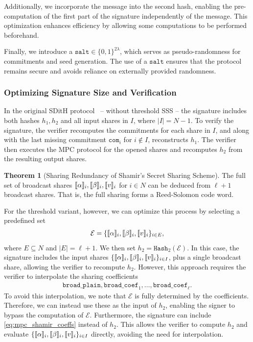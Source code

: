 \documentclass[11pt]{report}
\theoremstyle{definition}
\newtheorem{theorem}{Theorem}[section]
\theoremstyle{plain}
\begin{document}
Additionally, we incorporate the message into the second hash, enabling the pre-computation of the first part of the signature independently of the message. This optimization enhances efficiency by allowing some computations to be performed beforehand.

Finally, we introduce a $\texttt{salt} \in \{0,1\}^{2\lambda}$, which serves as pseudo-randomness for commitments and seed generation. The use of a $\texttt{salt}$ ensures that the protocol remains secure and avoids reliance on externally provided randomness.

\subsubsection{Optimizing Signature Size and Verification}\label{sec:mpc_thresh_tweak}
In the original SDitH protocol~\cite[Figure 1]{aguilarsyndrome11} -- without threshold SSS -- the signature includes both hashes $h_1, h_2$ and all input shares in $I$, where $|I| = N - 1$.
To verify the signature, the verifier recomputes the commitments for each share in $I$, and along with the last missing commitment $\texttt{com}_i$ for $i \notin I$, reconstructs $h_1$. The verifier then executes the MPC protocol for the opened shares and recomputes $h_2$ from the resulting output shares.

\begin{theorem}[Sharing Redundancy of Shamir's Secret Sharing Scheme]
  The full set of broadcast shares $\llbracket \alpha \rrbracket_i, \llbracket \beta \rrbracket_i, \llbracket v \rrbracket_i$ for $i \in N$ can be deduced from $\ell + 1$ broadcast shares. That is, the full sharing forms a Reed-Solomon code word.
\end{theorem}

\noindent
For the threshold variant, however, we can optimize this process by selecting a predefined set
\begin{align*}
  \mathcal{E} = \{\llbracket \alpha \rrbracket_i, \llbracket \beta \rrbracket_i, \llbracket v \rrbracket_i\}_{i \in E},
\end{align*}
where $E \subseteq N$ and $|E| = \ell + 1$. We then set $h_2 = \texttt{Hash}_2(\mathcal{E})$. In this case, the signature includes the input shares $\{\llbracket \alpha \rrbracket_i, \llbracket \beta \rrbracket_i, \llbracket v \rrbracket_i\}_{i \in I}$, plus a single broadcast share, allowing the verifier to recompute $h_2$. However, this approach requires the verifier to interpolate the sharing coefficients
\begin{align}
  \texttt{broad\_plain}, \texttt{broad\_coef}_1, \dots, \texttt{broad\_coef}_\ell.\label{eq:mpc_shamir_coeffs}
\end{align}
To avoid this interpolation, we note that $\mathcal{E}$ is fully determined by the coefficients. Therefore, we can instead use these as the input of $h_2$, enabling the signer to bypass the computation of $\mathcal{E}$. Furthermore, the signature can include \autoref{eq:mpc_shamir_coeffs} instead of $h_2$. This allows the verifier to compute $h_2$ and evaluate $\{\llbracket \alpha \rrbracket_i, \llbracket \beta \rrbracket_i, \llbracket v \rrbracket_i\}_{i \in I}$ directly, avoiding the need for interpolation.
\end{document}
